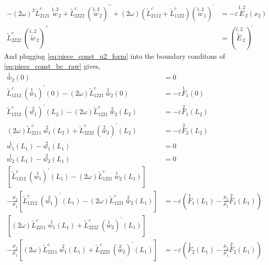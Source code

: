 \documentclass[11pt]{report}
\begin{document}
\begin{appendices}
\begin{equation}
\begin{aligned}
- (2 \omega)^2 \tilde{L}^{c}_{2121} \: \overset{1,2}{w}_2 + \tilde{L}^{c}_{2222} \: \left(\overset{1,2}{w}_2 \right)^{\prime \prime} + (2 \omega) (\tilde{L}^{c}_{2112} + \tilde{L}^{c}_{1122}) \left(\overset{1,2}{w}_1 \right)^\prime &= - \varepsilon \overset{1,2}{E}_2(x_2) \\
 \tilde{L}^c_{2222} \: \left( \overset{1,2}{\widetilde{w}}_2 \right)^{\prime \prime} &= \left( \overset{1,2}{\widetilde{E}}_2 \right)^\prime
\end{aligned}
\end{equation}
And plugging \eqref{eq:piece_const_u2_form} into the boundary conditons of \eqref{eq:piece_const_bc_raw} gives,
\begin{equation} \label{eq:piece_const_w_bcs}
\begin{aligned}
\overset{1}{w}_2(0) &= 0 \\
\tilde{L}^{c}_{1212} \: \left( \overset{1}{w}_1 \right) ^\prime (0) - (2 \omega) \tilde{L}^{c}_{1221} \: \overset{1}{w}_2(0) &= - \varepsilon \overset{1}{F}_1(0) \\
\tilde{L}^{c}_{1212} \: \left( \overset{2}{w_1} \right) ^\prime(L_2) - (2 \omega) \tilde{L}^{c}_{1221} \: \overset{2}{w}_2(L_2) &= - \varepsilon \overset{2}{F}_1(L_2) \\
(2 \omega) \tilde{L}^{c}_{2211} \: \overset{2}{w_1}(L_2) + \tilde{L}^{c}_{2222} \: \left( \overset{2}{w}_2 \right)^\prime (L_2) &= - \varepsilon \overset{2}{F}_2(L_2)  \\
\overset{1}{w_1}(L_1) - \overset{2}{w_1}(L_1) &= 0 \\
\overset{1}{w_2}(L_1) - \overset{2}{w_2}(L_1) &= 0 \\
\left[ \tilde{L}^{c}_{1212} \: \left( \overset{1}{w_1} \right) ^\prime(L_1) - (2 \omega) \tilde{L}^{c}_{1221} \: \overset{1}{w}_2(L_1) \right] \\
- \frac{\mu_2}{\mu_1}\left[ \tilde{L}^{c}_{1212} \: \left( \overset{2}{w_1} \right) ^\prime(L_1) - (2 \omega) \tilde{L}^{c}_{1221} \: \overset{2}{w}_2(L_1) \right] &=  -\varepsilon \left( \overset{1}{F}_1(L_1) - \frac{\mu_2}{\mu_1} \overset{2}{F}_1(L_1)\right) \\
\left[ (2 \omega) \tilde{L}^{c}_{2211} \: \overset{1}{w_1}(L_1) + \tilde{L}^{c}_{2222} \: \left( \overset{1}{w}_2 \right)^\prime (L_1) \right] \\
- \frac{\mu_2}{\mu_1}\left[ (2 \omega) \tilde{L}^{c}_{2211} \: \overset{2}{w_1}(L_1) + \tilde{L}^{c}_{2222} \: \left( \overset{2}{w}_2 \right)^\prime (L_1) \right] &=  -\varepsilon \left( \overset{1}{F}_2(L_1) - \frac{\mu_2}{\mu_1} \overset{2}{F}_2(L_1)\right)

\end{aligned}
\end{equation}
\end{appendices}
\end{document}
